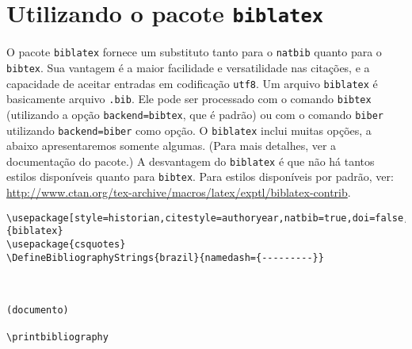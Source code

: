 \section{Utilizando o pacote \texttt{biblatex}}


O pacote \texttt{biblatex} fornece um substituto tanto para o \texttt{natbib} quanto para o \texttt{bibtex}. Sua vantagem é a maior facilidade e versatilidade nas citações, e a capacidade de aceitar entradas em codificação \texttt{utf8}. Um arquivo \texttt{biblatex} é basicamente arquivo \texttt{.bib}. Ele pode ser processado com o comando \texttt{bibtex} (utilizando a opção \texttt{backend=bibtex}, que é padrão) ou com o comando \texttt{biber} utilizando \texttt{backend=biber} como opção. O \texttt{biblatex} inclui muitas opções, a abaixo apresentaremos somente algumas. (Para mais detalhes, ver a documentação do pacote.) A desvantagem do \texttt{biblatex} é que não há tantos estilos disponíveis quanto para \texttt{bibtex}. Para estilos disponíveis por padrão, ver: \url{http://www.ctan.org/tex-archive/macros/latex/exptl/biblatex-contrib}.


\begin{verbatim}
\usepackage[style=historian,citestyle=authoryear,natbib=true,doi=false,backend=bibtex]{biblatex}
\usepackage{csquotes}
\DefineBibliographyStrings{brazil}{namedash={---------}}



(documento)

\printbibliography



\end{verbatim}

